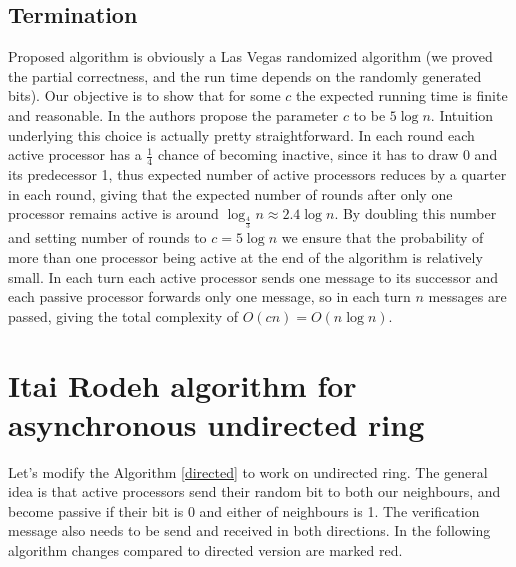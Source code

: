 \documentclass{article}
\begin{document}
\subsection{Termination}
Proposed algorithm is obviously a Las Vegas randomized algorithm (we proved the partial correctness, and the run time depends on the randomly generated bits). Our objective is to show that for some $c$ the expected running time is finite and reasonable. In \cite{ITAI199060} the authors propose the parameter $c$ to be $5\log n$. Intuition underlying this choice is actually pretty straightforward. In each round each active processor has a $\frac{1}{4}$ chance of becoming inactive, since it has to draw 0 and its predecessor 1, thus expected number of active processors reduces by a quarter in each round, giving that the expected number of rounds after only one processor remains active is around $\log_{\frac{4}{3}}n \approx 2.4\log n$. By doubling this number and setting number of rounds to $c=5\log n$ we ensure that the probability of more than one processor being active at the end of the algorithm is relatively small. In each turn each active processor sends one message to its successor and each passive processor forwards only one message, so in each turn $n$ messages are passed, giving the total complexity of $O(cn) = O(n\log n)$.

\section{Itai Rodeh algorithm for asynchronous undirected ring}

Let's modify the Algorithm \ref{directed} to work on undirected ring. The general idea is that active processors send their random bit to both our neighbours, and become passive if their bit is 0 and either of neighbours is 1. The verification message also needs to be send and received in both directions. In the following algorithm changes compared to directed version are marked red.
\end{document}

